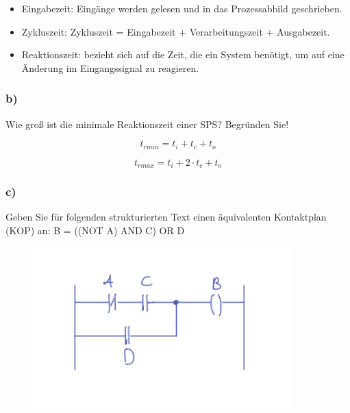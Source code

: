\begin{itemize}
  \item Eingabezeit: Eingänge werden gelesen und in das Prozessabbild geschrieben.
  \item Zykluszeit: Zykluszeit = Eingabezeit + Verarbeitungszeit + Ausgabezeit. 
  \item Reaktionszeit: bezieht sich auf die Zeit, die ein System benötigt, um auf eine Änderung im Eingangssignal zu reagieren.
\end{itemize}

\subsubsection{b)}
Wie groß ist die minimale Reaktionszeit einer SPS? Begründen Sie!

\begin{equation}
  t_{rmin} = t_i + t_c + t_o
\end{equation}

\begin{equation}
  t_{rmax} = t_i + 2\cdot t_c + t_o
\end{equation}


\subsubsection{c)}
Geben Sie für folgenden strukturierten Text einen äquivalenten Kontaktplan (KOP) an: B = ((NOT A)
AND C) OR D

\begin{figure}[H]
  \includegraphics[width=10cm]{images/KA280521/6c.PNG}
  \centering
\end{figure}